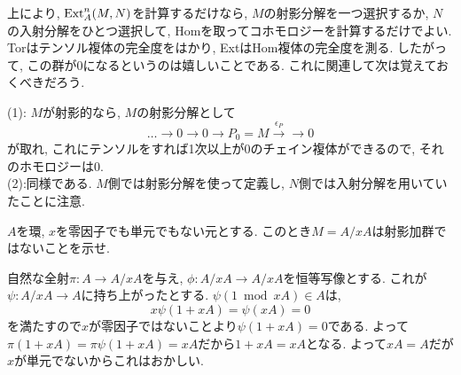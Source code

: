 上により, $\mathrm{Ext}^{n}_{A}(M,N)$を計算するだけなら, $M$の射影分解を一つ選択するか, $N$の入射分解をひとつ選択して, Homを取ってコホモロジーを計算するだけでよい. Torはテンソル複体の完全度をはかり, ExtはHom複体の完全度を測る. したがって, この群が0になるというのは嬉しいことである.  これに関連して次は覚えておくべきだろう.
\begin{egans}
(1): $M$が射影的なら, $M$の射影分解として
\[\dots\to 0\to 0\to P_0 = M \xrightarrow{\epsilon_P} \to 0\]
が取れ, これにテンソルをすれば1次以上が0のチェイン複体ができるので, それのホモロジーは0. \\
(2):同様である. $M$側では射影分解を使って定義し, $N$側では入射分解を用いていたことに注意.
\end{egans}


\begin{egprob}
$A$を環, $x$を零因子でも単元でもない元とする. このとき$M=A/xA$は射影加群ではないことを示せ.
\end{egprob}
\begin{egans}
自然な全射$\pi:A\to A/xA$を与え, $\phi:A/xA\to A/xA$を恒等写像とする. これが$\psi:A/xA\to A$に持ち上がったとする. $\psi(1\bmod{xA})\in A$は,
\[x\psi(1+xA) = \psi(xA) = 0\]
を満たすので$x$が零因子ではないことより$\psi(1+xA) = 0$である. よって$\pi(1 + xA) = \pi\psi(1+xA) = xA$だから$1+xA = xA$となる. よって$xA=A$だが$x$が単元でないからこれはおかしい.
\end{egans}

